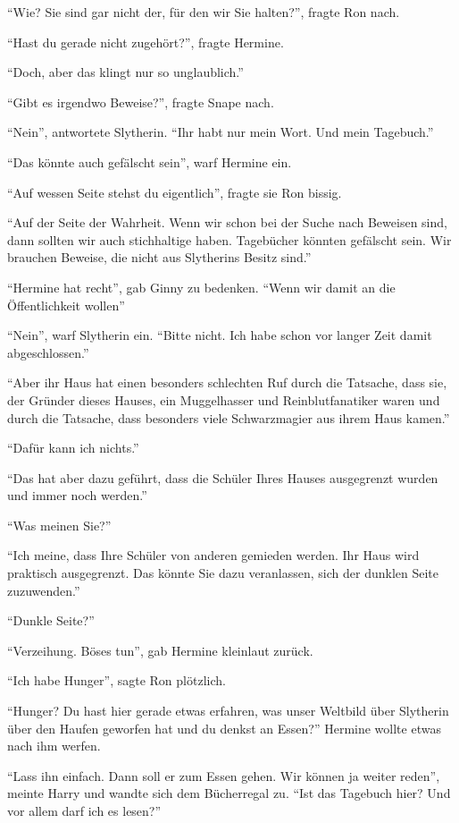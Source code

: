 \enquote{Wie? Sie sind gar nicht der, für den wir Sie halten?}, fragte Ron nach.

\enquote{Hast du gerade nicht zugehört?}, fragte Hermine.

\enquote{Doch, aber das klingt nur so unglaublich.}

\enquote{Gibt es irgendwo Beweise?}, fragte Snape nach.

\enquote{Nein}, antwortete Slytherin. \enquote{Ihr habt nur mein Wort. Und mein Tagebuch.}

\enquote{Das könnte auch gefälscht sein}, warf Hermine ein.

\enquote{Auf wessen Seite stehst du eigentlich}, fragte sie Ron bissig.

\enquote{Auf der Seite der Wahrheit. Wenn wir schon bei der Suche nach Beweisen sind, dann sollten wir auch stichhaltige haben. Tagebücher könnten gefälscht sein. Wir brauchen Beweise, die nicht aus Slytherins Besitz sind.}

\enquote{Hermine hat recht}, gab Ginny zu bedenken. \enquote{Wenn wir damit an die Öffentlichkeit wollen\abs}

\enquote{Nein}, warf Slytherin ein. \enquote{Bitte nicht. Ich habe schon vor langer Zeit damit abgeschlossen.}

\enquote{Aber ihr Haus hat einen besonders schlechten Ruf durch die Tatsache, dass sie, der Gründer dieses Hauses, ein Muggelhasser und Reinblutfanatiker waren und durch die Tatsache, dass besonders viele Schwarzmagier aus ihrem Haus kamen.}

\enquote{Dafür kann ich nichts.}

\enquote{Das hat aber dazu geführt, dass die Schüler Ihres Hauses ausgegrenzt wurden und immer noch werden.}

\enquote{Was meinen Sie?}

\enquote{Ich meine, dass Ihre Schüler von anderen gemieden werden. Ihr Haus wird praktisch ausgegrenzt. Das könnte Sie dazu veranlassen, sich der dunklen Seite zuzuwenden.}

\enquote{Dunkle Seite?}

\enquote{Verzeihung. Böses tun}, gab Hermine kleinlaut zurück.

\enquote{Ich habe Hunger}, sagte Ron plötzlich.

\enquote{Hunger? Du hast hier gerade etwas erfahren, was unser Weltbild über Slytherin über den Haufen geworfen hat und du denkst an Essen?} Hermine wollte etwas nach ihm werfen.

\enquote{Lass ihn einfach. Dann soll er zum Essen gehen. Wir können ja weiter reden}, meinte Harry und wandte sich dem Bücherregal zu. \enquote{Ist das Tagebuch hier? Und vor allem \gst darf ich es lesen?}


